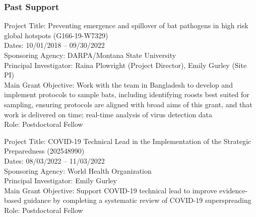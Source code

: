 \documentclass{cv}
\begin{document}
\subsubsection*{Past Support}

Project Title: Preventing emergence and spillover of bat pathogens in high risk global hotspots (G166-19-W7329) \\
Dates: 10/01/2018 -- 09/30/2022 \\
Sponsoring Agency: DARPA/Montana State University \\
Principal Investigator: Raina Plowright (Project Director), Emily Gurley (Site PI) \\
Main Grant Objective: Work with the team in Bangladesh to develop and implement protocols to sample bats, including identifying roosts best suited for sampling, ensuring protocols are aligned with broad aims of this grant, and that work is delivered on time; real-time analysis of virus detection data \\
Role: Postdoctoral Fellow

Project Title: COVID-19 Technical Lead in the Implementation of the Strategic Preparedness (202548990) \\
Dates: 08/03/2022 -- 11/03/2022 \\
Sponsoring Agency: World Health Organization \\
Principal Investigator: Emily Gurley \\
Main Grant Objective: Support COVID-19 technical lead to improve evidence-based guidance by completing a systematic review of COVID-19 superspreading \\
Role: Postdoctoral Fellow




\end{document}
